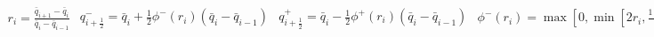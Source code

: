 \documentclass[SingleSpace,12pt]{Serre_ASCE}
\begin{document}
\begin{linenomath*}
\begin{subequations}\label{eq:recon2}
\begin{gather}\label{eq:recon2r}
r_i = \frac{\bar{q}_{i+1} - \bar{q}_{i} }{\bar{q}_{i} - \bar{q}_{i-1}}
\end{gather}
\begin{gather}\label{eq:recon21}
q^-_{i + \frac{1}{2}} = \bar{q}_i + \frac{1}{2}\phi^-\left(r_i\right)\left(\bar{q}_i -\bar{q}_{i-1} \right)
\end{gather}
\begin{gather}\label{eq:recon22}
q^+_{i + \frac{1}{2}} = \bar{q}_i - \frac{1}{2}\phi^+\left(r_i\right)\left(\bar{q}_i -\bar{q}_{i-1} \right)
\end{gather}
\begin{gather}\label{eq:recon2p1}
\phi^-\left(r_i\right) = \max\left[0, \min\left[2 r_i, \frac{1 + 2r_i}{3},2\right]\right]
\end{gather}
\begin{gather}\label{eq:recon2p2}
\phi^+\left(r_i\right) = \max\left[0, \min\left[2 r_i, \frac{2 + r_i}{3},2\right]\right]
\end{gather}
\end{subequations}
\end{linenomath*}

\end{document}
